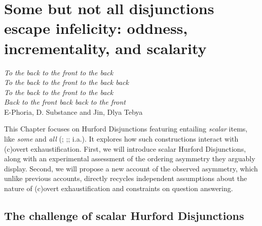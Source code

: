 \chapter[Some but not all disjunctions escape infelicity: oddness, incrementality, and scalarity]{Some but not all disjunctions escape infelicity: oddness, incrementality, and scalarity\footnotemark}\label{chap:scalarity}

\begin{flushright}
	\textit{To the back to the front to the back}\\
	\textit{To the back to the front to the back back}\\
	\textit{To the back to the front to the back}\\
	\textit{Back to the front back back to the front}\\
	\vspace{2mm}
	E-Phoria, D. Substance and Jin, Dlya Tebya
\end{flushright}
This Chapter focuses on Hurford Disjunctions
featuring entailing \textit{scalar} items, like \textit{some} and \textit{all} (; ;; i.a.). It explores how such constructions interact with (c)overt exhaustification. First, we will introduce scalar Hurford Disjunctions, along with an experimental assessment of the ordering asymmetry they arguably display. Second, we will propose a new account of the observed asymmetry, which unlike previous accounts, directly recycles independent assumptions about the nature of (c)overt exhaustification and constraints on question answering. 

\section{The challenge of scalar Hurford Disjunctions}\label{sec7:asym-exp}


